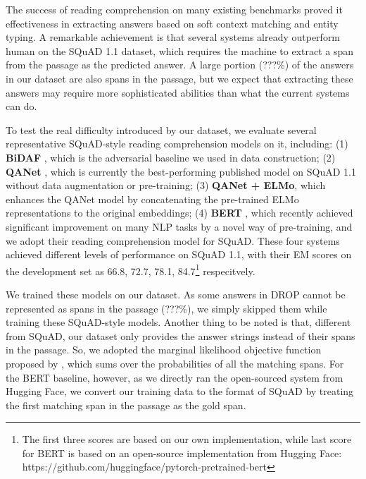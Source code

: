 The success of reading comprehension on many existing benchmarks proved it effectiveness in extracting answers based on soft context matching and entity typing. A remarkable achievement is that several systems already outperform human on the SQuAD 1.1 \cite{Rajpurkar2016SQuAD10} dataset, which requires the machine to extract a span from the passage as the predicted answer. A large portion (???\%) of the answers in our dataset are also spans in the passage, but we expect that extracting these answers may require more sophisticated abilities than what the current systems can do.

To test the real difficulty introduced by our dataset, we evaluate several representative SQuAD-style reading comprehension models on it, including:
(1) \textbf{BiDAF} \cite{Seo2016BidirectionalAF}, which is the adversarial baseline we used in data construction; 
(2) \textbf{QANet} \cite{yu2018qanet}, which is currently the best-performing published model on SQuAD 1.1 without data augmentation or pre-training; 
(3) \textbf{QANet + ELMo}, which enhances the QANet model by concatenating the pre-trained ELMo \cite{peters2018elmo} representations to the original embeddings; 
(4) \textbf{BERT} \cite{Devlin2018BERTPO}, which recently achieved significant improvement on many NLP tasks by a novel way of pre-training, and we adopt their reading comprehension model for SQuAD. These four systems achieved different levels of performance on SQuAD 1.1, with their EM scores on the development set as 66.8, 72.7, 78.1, 84.7\footnote{The first three scores are based on our own implementation, while last score for BERT is based on an open-source implementation from Hugging Face: https://github.com/huggingface/pytorch-pretrained-bert} respecitvely.

We trained these models on our dataset. As some answers in DROP cannot be represented as spans in the passage (???\%), we simply skipped them while training these SQuAD-style models. Another thing to be noted is that, different from SQuAD, our dataset only provides the answer strings instead of their spans in the passage. So, we adopted the marginal likelihood objective function proposed by , which sums over the probabilities of all the matching spans. For the BERT baseline, however, as we directly ran the open-sourced system from Hugging Face, we convert our training data to the format of SQuAD by treating the first matching span in the passage as the gold span. 